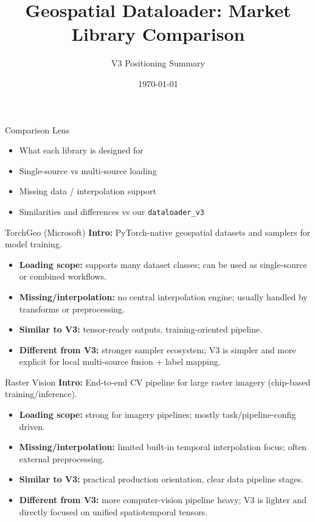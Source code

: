 \documentclass{beamer}
\title{Geospatial Dataloader: Market Library Comparison}
\author{V3 Positioning Summary}
\date{\today}
\begin{document}
\begin{frame}
  \titlepage
\end{frame}

\begin{frame}{Comparison Lens}
\begin{itemize}
  \item What each library is designed for
  \item Single-source vs multi-source loading
  \item Missing data / interpolation support
  \item Similarities and differences vs our \texttt{dataloader\_v3}
\end{itemize}
\end{frame}

\begin{frame}{TorchGeo (Microsoft)}
\textbf{Intro:} PyTorch-native geospatial datasets and samplers for model training.
\begin{itemize}
  \item \textbf{Loading scope:} supports many dataset classes; can be used as single-source or combined workflows.
  \item \textbf{Missing/interpolation:} no central interpolation engine; usually handled by transforms or preprocessing.
  \item \textbf{Similar to V3:} tensor-ready outputs, training-oriented pipeline.
  \item \textbf{Different from V3:} stronger sampler ecosystem; V3 is simpler and more explicit for local multi-source fusion + label mapping.
\end{itemize}
\end{frame}

\begin{frame}{Raster Vision}
\textbf{Intro:} End-to-end CV pipeline for large raster imagery (chip-based training/inference).
\begin{itemize}
  \item \textbf{Loading scope:} strong for imagery pipelines; mostly task/pipeline-config driven.
  \item \textbf{Missing/interpolation:} limited built-in temporal interpolation focus; often external preprocessing.
  \item \textbf{Similar to V3:} practical production orientation, clear data pipeline stages.
  \item \textbf{Different from V3:} more computer-vision pipeline heavy; V3 is lighter and directly focused on unified spatiotemporal tensors.
\end{itemize}
\end{frame}
\end{document}
